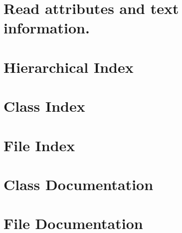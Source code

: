 \documentclass[twoside]{book}
\newcommand{\+}{\discretionary{\mbox{\scriptsize$\hookleftarrow$}}{}{}}
\begin{document}
\chapter{Read attributes and text information.}
\label{_example-4}
\hypertarget{_example-4}{}

\chapter{Hierarchical Index}

\chapter{Class Index}

\chapter{File Index}

\chapter{Class Documentation}





































\chapter{File Documentation}



\newpage
{}
{}
\printindex
\end{document}
